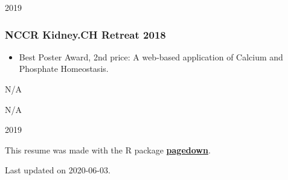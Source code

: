 \documentclass[
]{article}
\providecommand{\tightlist}{%
  \setlength{\itemsep}{0pt}\setlength{\parskip}{0pt}}
\begin{document}
2019

\hypertarget{nccr-kidney.ch-retreat-2018-1}{%
\subsubsection{NCCR Kidney.CH Retreat
2018}\label{nccr-kidney.ch-retreat-2018-1}}

\begin{itemize}
\tightlist
\item
  Best Poster Award, 2nd price: A web-based application of Calcium and
  Phosphate Homeostasis.
\end{itemize}

N/A

N/A

2019

This resume was made with the R package
\href{https://github.com/rstudio/pagedown}{\textbf{pagedown}}.

Last updated on 2020-06-03.
\end{document}
